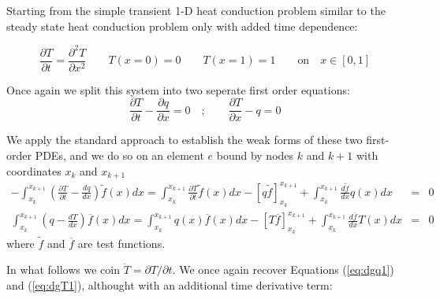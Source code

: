 
Starting from the simple transient 1-D heat conduction problem similar to the 
steady state heat conduction problem only with added time dependence:

\begin{equation}
\frac{\partial T}{\partial t}=\frac{\partial^2T}{\partial x^2} \qquad T(x=0)=0 \qquad T(x=1)=1 \qquad \text{on} \quad x\in[0,1]
\end{equation}


Once again we split this system into two seperate first order equations:
\begin{equation}
\frac{\partial T}{\partial t}-\frac{\partial q}{\partial x}=0 \quad;\qquad \frac{\partial T}{\partial x} -q =0
\end{equation}

We apply the standard approach to establish the weak forms of these two first-order PDEs, and we do so 
on an element $e$ bound by nodes $k$ and $k+1$ with coordinates $x_k$ and $x_{k+1}$
\begin{eqnarray}
-\int_{x_k}^{x_{k+1}} \left( \frac{\partial T}{\partial t}- \frac{dq}{dx} \right) \tilde{f}(x) dx =
\int_{x_k}^{x_{k+1}} \frac{\partial T}{\partial t} \tilde{f}(x)dx
 -\left[q \tilde{f} \right]_{x_k}^{x_{k+1}} 
+ \int_{x_k}^{x_{k+1}} \frac{d\tilde{f}}{dx} q(x) dx &=& 0
\label{eq:dg1}\\
\int_{x_k}^{x_{k+1}}  \left( q-\frac{dT}{dx} \right) \overline{f}(x) dx
=
\int_{x_k}^{x_{k+1}}  q(x) \overline{f}(x) dx
-\left[ T \overline{f}  \right]_{x_k}^{x_{k+1}} + \int_{x_k}^{x_{k+1}} \frac{d\overline{f}}{dx} T(x) dx 
&=& 0
\label{eq:dg2}
\end{eqnarray}
where $\tilde{f}$ and $\overline{f}$ are test functions.


In what follows we coin $\dot{T}=\partial T/\partial t$. 
We once again recover Equations (\ref{eq:dgq1}) and (\ref{eq:dgT1}), althought with 
an additional time derivative term: 



